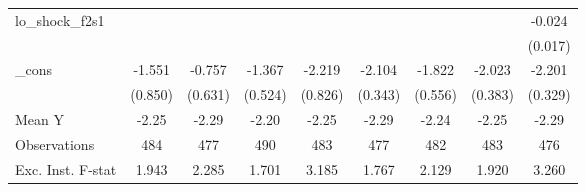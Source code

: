 {\begin{tabular}{l*{8}{c}}
\addlinespace
lo\_shock\_f2s1&                     &                     &                     &                     &                     &                     &                     &      -0.024         \\
            &                     &                     &                     &                     &                     &                     &                     &     (0.017)         \\
\addlinespace
\_cons      &      -1.551\sym{*}  &      -0.757         &      -1.367\sym{**} &      -2.219\sym{**} &      -2.104\sym{***}&      -1.822\sym{***}&      -2.023\sym{***}&      -2.201\sym{***}\\
            &     (0.850)         &     (0.631)         &     (0.524)         &     (0.826)         &     (0.343)         &     (0.556)         &     (0.383)         &     (0.329)         \\
\midrule
Mean Y      &       -2.25         &       -2.29         &       -2.20         &       -2.25         &       -2.29         &       -2.24         &       -2.25         &       -2.29         \\
Observations&         484         &         477         &         490         &         483         &         477         &         482         &         483         &         476         \\
Exc. Inst. F-stat&       1.943         &       2.285         &       1.701         &       3.185         &       1.767         &       2.129         &       1.920         &       3.260         \\
\bottomrule
\end{tabular}
}

